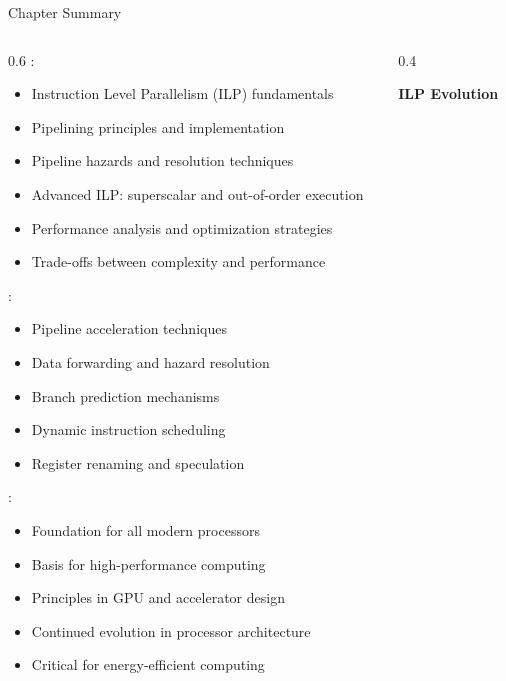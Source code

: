 \begin{frame}{Chapter Summary}
\begin{columns}
\begin{column}{0.6\textwidth}
:
\begin{itemize}
\item Instruction Level Parallelism (ILP) fundamentals
\item Pipelining principles and implementation
\item Pipeline hazards and resolution techniques
\item Advanced ILP: superscalar and out-of-order execution
\item Performance analysis and optimization strategies
\item Trade-offs between complexity and performance
\end{itemize}

\vspace{0.3cm}
:
\begin{itemize}
\item Pipeline acceleration techniques
\item Data forwarding and hazard resolution
\item Branch prediction mechanisms
\item Dynamic instruction scheduling
\item Register renaming and speculation
\end{itemize}

\vspace{0.3cm}
:
\begin{itemize}
\item Foundation for all modern processors
\item Basis for high-performance computing
\item Principles in GPU and accelerator design
\item Continued evolution in processor architecture
\item Critical for energy-efficient computing
\end{itemize}
\end{column}
\begin{column}{0.4\textwidth}
\begin{center}
\textbf{ILP Evolution}
\vspace{0.3cm}

\end{center}
\end{column}
\end{columns}
\end{frame}

